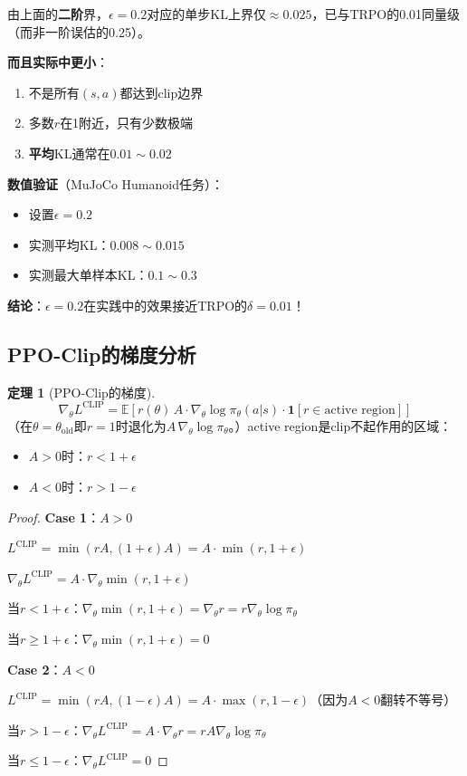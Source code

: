 \documentclass[11pt,a4paper]{article}
\theoremstyle{definition}
\newtheorem{theorem}{定理}[section]
\begin{document}
\begin{surprising}[$\epsilon = 0.2$为什么Work？]
由上面的\textbf{二阶}界，$\epsilon = 0.2$对应的单步KL上界仅$\approx 0.025$，已与TRPO的0.01同量级（而非一阶误估的0.25）。

\textbf{而且实际中更小}：
\begin{enumerate}
    \item 不是所有$(s,a)$都达到clip边界
    \item 多数$r$在1附近，只有少数极端
    \item \textbf{平均}KL通常在$0.01 \sim 0.02$
\end{enumerate}

\textbf{数值验证}（MuJoCo Humanoid任务）：
\begin{itemize}
    \item 设置$\epsilon = 0.2$
    \item 实测平均KL：$0.008 \sim 0.015$
    \item 实测最大单样本KL：$0.1 \sim 0.3$
\end{itemize}

\textbf{结论}：$\epsilon = 0.2$在实践中的效果接近TRPO的$\delta = 0.01$！
\end{surprising}

\subsection{PPO-Clip的梯度分析}

\begin{theorem}[PPO-Clip的梯度]
\[
\nabla_\theta L^{\text{CLIP}} = \mathbb{E}\left[r(\theta)\, A \cdot \nabla_\theta \log \pi_\theta(a|s) \cdot \mathbf{1}[r \in \text{active region}]\right]
\]
（在$\theta=\theta_{\text{old}}$即$r=1$时退化为$A\,\nabla_\theta\log\pi_\theta$。）active region是clip不起作用的区域：
\begin{itemize}
    \item $A > 0$时：$r < 1 + \epsilon$
    \item $A < 0$时：$r > 1 - \epsilon$
\end{itemize}
\end{theorem}

\begin{proof}
\textbf{Case 1}：$A > 0$

$L^{\text{CLIP}} = \min(rA, (1+\epsilon)A) = A \cdot \min(r, 1+\epsilon)$

$\nabla_\theta L^{\text{CLIP}} = A \cdot \nabla_\theta \min(r, 1+\epsilon)$

当$r < 1+\epsilon$：$\nabla_\theta \min(r, 1+\epsilon) = \nabla_\theta r = r \nabla_\theta \log \pi_\theta$

当$r \geq 1+\epsilon$：$\nabla_\theta \min(r, 1+\epsilon) = 0$

\textbf{Case 2}：$A < 0$

$L^{\text{CLIP}} = \min(rA, (1-\epsilon)A) = A \cdot \max(r, 1-\epsilon)$（因为$A < 0$翻转不等号）

当$r > 1-\epsilon$：$\nabla_\theta L^{\text{CLIP}} = A \cdot \nabla_\theta r = rA \nabla_\theta \log \pi_\theta$

当$r \leq 1-\epsilon$：$\nabla_\theta L^{\text{CLIP}} = 0$
\end{proof}
\end{document}
